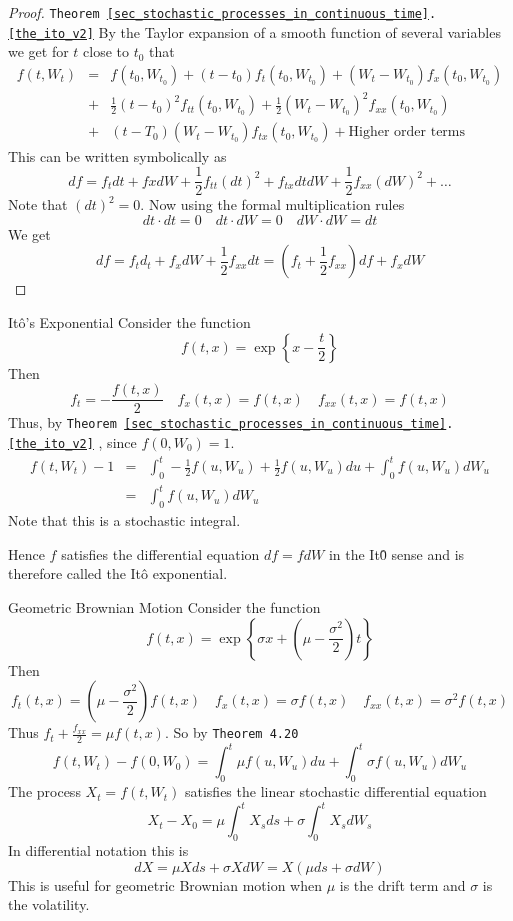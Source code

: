 \documentclass[11pt,a4paper]{article}
\begin{document}
  \begin{proof}{\texttt{Theorem \ref{sec_stochastic_processes_in_continuous_time}.\ref{the_ito_v2}}}
    By the Taylor expansion of a smooth function of several variables we get for $t$ close to $t_0$ that
    \[\begin{array}{rcl}
      f(t,W_t)&=&f(t_0,W_{t_0})+(t-t_0)f_t(t_0,W_{t_0})+(W_t-W_{t_0})f_x(t_0,W_{t_0})\\
      &+&\frac12(t-t_0)^2f_{tt}(t_0,W_{t_0})+\frac12(W_t-W_{t_0})^2f_{xx}(t_0,W_{t_0})\\
      &+&(t-T_0)(W_t-W_{t_0})f_{tx}(t_0,W_{t_0})+\text{Higher order terms}
    \end{array}\]
    This can be written symbolically as
    \[ df=f_tdt+fxdW+\frac12f_{tt}(dt)^2+f_{tx}dtdW+\frac12f_{xx}(dW)^2+\dots \]
    Note that $(dt)^2=0$. Now using the formal multiplication rules
    \[ dt\cdot dt=0\quad dt\cdot dW=0\quad dW\cdot dW=dt \]
    We get
    \[ df=f_td_t+f_xdW+\frac12f_{xx}dt=(f_t+\frac12f_{xx})df+f_xdW \]
  \end{proof}

  \begin{example}{It\^o's Exponential}
    Consider the function
    \[ f(t,x)=\exp\left\{x-\frac{t}2\right\} \]
    Then
    \[ f_t=-\frac{f(t,x)}2\quad f_x(t,x)=f(t,x)\quad f_{xx}(t,x)=f(t,x) \]
    Thus, by \texttt{Theorem \ref{sec_stochastic_processes_in_continuous_time}.\ref{the_ito_v2}} , since $f(0,W_0)=1$.
    \[\begin{array}{rcl}
      f(t,W_t)-1&=&\int_0^t-\frac12f(u,W_u)+\frac12 f(u,W_u)du+\int_0^tf(u,W_u)dW_u\\
      &=&\int_0^tf(u,W_u)dW_u
    \end{array}\]
    Note that this is a stochastic integral.
    \par Hence $f$ satisfies the differential equation $df=fdW$ in the It\^0 sense and is therefore called the It\^o exponential.
  \end{example}

  \begin{example}{Geometric Brownian Motion}
    Consider the function
    \[ f(t,x)=\exp\left\{\sigma x+(\mu-\frac{\sigma^2}2)t\right\} \]
    Then
    \[ f_t(t,x)=\left(\mu-\frac{\sigma^2}2\right)f(t,x)\quad f_x(t,x)=\sigma f(t,x)\quad f_{xx}(t,x)=\sigma^2f(t,x) \]
    Thus $f_t+\frac{f_{xx}}2=\mu f(t,x)$. So by \texttt{Theorem 4.20}
    \[ f(t,W_t)-f(0,W_0)=\int_0^t\mu f(u,W_u)du+\int_0^t\sigma f(u,W_u)dW_u \]
    The process $X_t=f(t,W_t)$ satisfies the linear stochastic differential equation
    \[ X_t-X_0=\mu\int_0^tX_sds+\sigma\int_0^tX_sdW_s \]
    In differential notation this is
    \[ dX=\mu Xds+\sigma XdW=X(\mu ds+\sigma dW) \]
    This is useful for geometric Brownian motion when $\mu$ is the drift term and $\sigma$ is the volatility.
  \end{example}
\end{document}
